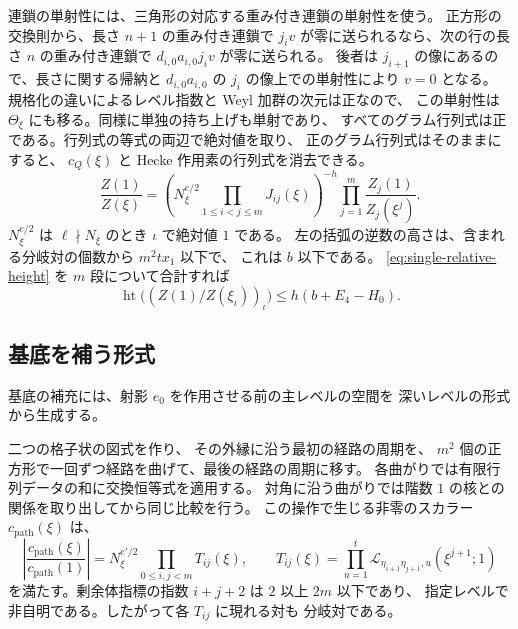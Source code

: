 連鎖の単射性には、三角形の対応する重み付き連鎖の単射性を使う。
正方形の交換則から、長さ \(n+1\) の重み付き連鎖で
\(j_i v\) が零に送られるなら、次の行の長さ \(n\) の重み付き連鎖で
\(d_{i,0}a_{i,0}j_i v\) が零に送られる。
後者は \(j_{i+1}\) の像にあるので、長さに関する帰納と
\(d_{i,0}a_{i,0}\) の \(j_i\) の像上での単射性により \(v=0\) となる。
規格化の違いによるレベル指数と Weyl 加群の次元は正なので、
この単射性は \(\Theta_\xi\) にも移る。同様に単独の持ち上げも単射であり、
すべてのグラム行列式は正である。行列式の等式の両辺で絶対値を取り、
正のグラム行列式はそのままにすると、
\(c_Q(\xi)\) と Hecke 作用素の行列式を消去できる。
\begin{equation}
 \frac{Z(1)}{Z(\xi)}
 =
 \left(N_\xi^{e/2}\prod_{1\le i<j\le m}J_{ij}(\xi)\right)^{-h}
       \prod_{j=1}^m\frac{Z_j(1)}{Z_j(\xi^j)} .
 \label{eq:chain-relative-factorization}
\end{equation}
\(N_\xi^{e/2}\) は \(\ell\nmid N_\xi\) のとき \(\iota\) で絶対値 \(1\) である。
左の括弧の逆数の高さは、含まれる分岐対の個数から \(m^2t x_1\) 以下で、
これは \(b\) 以下である。
\eqref{eq:single-relative-height} を \(m\) 段について合計すれば
\begin{equation}
 \operatorname{ht}\bigl((Z(1)/Z(\xi_\iota))_\iota\bigr)
       \le h(b+E_4-H_0).
 \label{eq:chain-relative-height}
\end{equation}

\subsection{基底を補う形式}

基底の補充には、射影 \(e_0\) を作用させる前の主レベルの空間を
深いレベルの形式から生成する。


二つの格子状の図式を作り、
その外縁に沿う最初の経路の周期を、
\(m^2\) 個の正方形で一回ずつ経路を曲げて、最後の経路の周期に移す。
各曲がりでは有限行列データの和に交換恒等式を適用する。
対角に沿う曲がりでは階数 \(1\) の核との関係を取り出してから同じ比較を行う。
この操作で生じる非零のスカラー \(c_{\mathrm{path}}(\xi)\) は、
\begin{equation}
 \left|\frac{c_{\mathrm{path}}(\xi)}{c_{\mathrm{path}}(1)}\right|
   =N_\xi^{e'/2}\prod_{0\le i,j<m} T_{ij}(\xi),\qquad
 T_{ij}(\xi)=
    \prod_{u=1}^{t}\mathcal L_{\eta_{i+1}\eta_{j+1},u}(\xi^{j+1};1)
 \label{eq:turn-ratio-lower}
\end{equation}
を満たす。剰余体指標の指数 \(i+j+2\) は \(2\) 以上 \(2m\) 以下であり、
指定レベルで非自明である。したがって各 \(T_{ij}\) に現れる対も
分岐対である。


